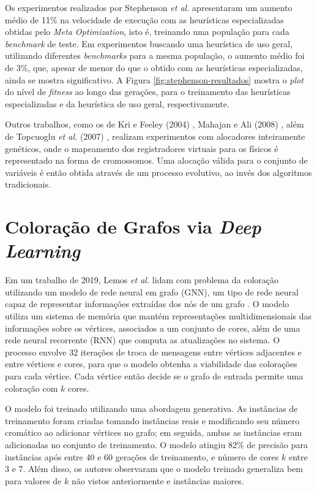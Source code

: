 \documentclass[
	12pt,				%
	openright,			%
	twoside,			%
	a4paper,			%
	tcc,			%
	]{ABNT-DC-UEL}
\begin{document}
Os experimentos realizados por Stephenson \textit{et al.} apresentaram um aumento médio de 11\% na velocidade de execução com as heurísticas especializadas obtidas pelo \textit{Meta Optimization}, isto é, treinando uma população para cada \textit{benchmark} de teste. Em experimentos buscando uma heurística de uso geral, utilizando diferentes \textit{benchmarks} para a mesma população, o aumento médio foi de 3\%, que, apesar de menor do que o obtido com as heurísticas especializadas, ainda se mostra significativo. A Figura \ref{fig:stephenson-resultados} mostra o \textit{plot} do nível de \textit{fitness} ao longo das gerações, para o treinamento das heurísticas especializadas e da heurística de uso geral, respectivamente.

Outros trabalhos, como os de Kri e Feeley (2004) \cite{kri:04}, Mahajan e Ali (2008) \cite{mahajan:08}, além de Topcuoglu \textit{et al.} (2007) \cite{topcuoglu:07}, realizam experimentos com alocadores inteiramente genéticos, onde o mapeamento dos registradores virtuais para os físicos é representado na forma de cromossomos. Uma alocação válida para o conjunto de variáveis é então obtida através de um processo evolutivo, ao invés dos algoritmos tradicionais.

\section{Coloração de Grafos via \textit{Deep Learning}} \label{sec:coloracao-deep-learning}

Em um trabalho de 2019, Lemos \textit{et al.} \cite{lemos:19} lidam com problema da coloração utilizando um modelo de rede neural em grafo (GNN), um tipo de rede neural capaz de representar informações extraídas dos nós de um grafo \cite{scarselli:09}. O modelo utiliza um sistema de memória que mantém representações multidimensionais das informações sobre os vértices, associados a um conjunto de cores, além de uma rede neural recorrente (RNN) que computa as atualizações no sistema. O processo envolve 32 iterações de troca de mensagens entre vértices adjacentes e entre vértices e cores, para que o modelo obtenha a viabilidade das colorações para cada vértice. Cada vértice então decide se o grafo de entrada permite uma coloração com $k$ cores.

O modelo foi treinado utilizando uma abordagem generativa. As instâncias de treinamento foram criadas tomando instâncias reais e modificando seu número cromático ao adicionar vértices no grafo; em seguida, ambas as instâncias eram adicionadas no conjunto de treinamento. O modelo atingiu 82\% de precisão para instâncias após entre 40 e 60 gerações de treinamento, e número de cores $k$ entre 3 e 7. Além disso, os autores observaram que o modelo treinado generaliza bem para valores de $k$ não vistos anteriormente e instâncias maiores.
\end{document}
